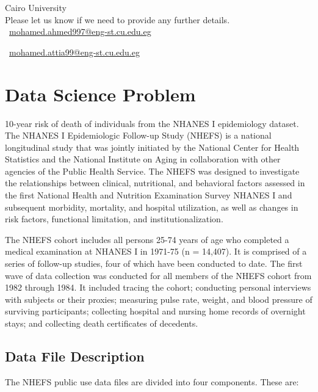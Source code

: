 \documentclass[5 pt]{article}
\begin{document}
\begin{titlepage}
\begin{center}
\vspace{1cm}
Cairo University\\

Please let us know if we need to provide any further details.\\


\faEnvelope\ \underline{\href{mailto:mohamed.ahmed997@eng-st.cu.edu.eg}{mohamed.ahmed997@eng-st.cu.edu.eg}}

\hspace{-.7cm} \faEnvelope\ \underline{\href{mailto:mohamed.attia99@eng-st.cu.edu.eg}{mohamed.attia99@eng-st.cu.edu.eg}}



\end{center}
\end{titlepage}
\newpage


\section{Data Science Problem}
10-year risk of death of individuals from the NHANES I epidemiology dataset.\\

The NHANES I Epidemiologic Follow-up Study (NHEFS) is a national longitudinal study that was jointly initiated by the National Center for Health Statistics and the National Institute on Aging in collaboration with other agencies of the Public Health Service. The NHEFS was designed to investigate the relationships between clinical, nutritional, and behavioral factors assessed in the first National Health and Nutrition Examination Survey NHANES I and subsequent morbidity, mortality, and hospital utilization, as well as changes in risk factors, functional limitation, and institutionalization.

The NHEFS cohort includes all persons 25-74 years of age who completed a medical examination at NHANES I in 1971-75 (n = 14,407). It is comprised of a series of follow-up studies, four of which have been conducted to date. The first wave of data collection was conducted for all members of the NHEFS cohort from 1982 through 1984. It included tracing the cohort; conducting personal interviews with subjects or their proxies; measuring pulse rate, weight, and blood pressure of surviving participants; collecting hospital and nursing home records of overnight stays; and collecting death certificates of decedents.


\subsection{Data File Description}
The NHEFS public use data files are divided into four components. These are:
\end{document}
